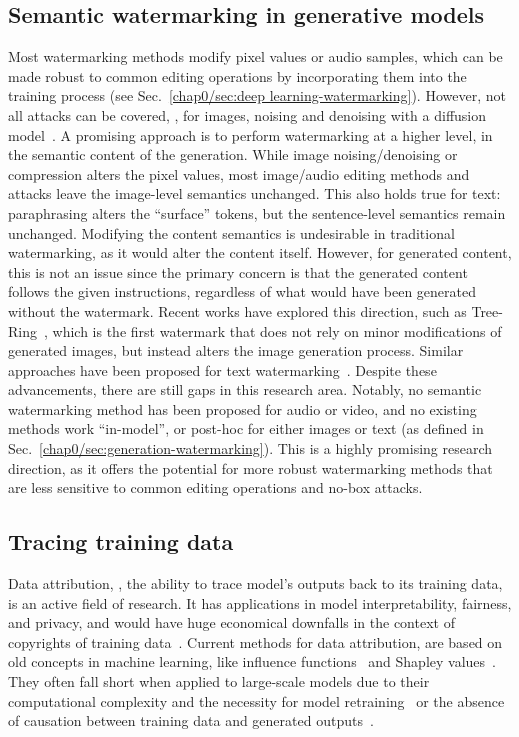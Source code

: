\subsection{Semantic watermarking in generative models}

Most watermarking methods modify pixel values or audio samples, which can be made robust to common editing operations by incorporating them into the training process (see Sec.~\ref{chap0/sec:deep learning-watermarking}).
However, not all attacks can be covered, \eg, for images, noising and denoising with a diffusion model~\citep{nie2022diffusion}.
A promising approach is to perform watermarking at a higher level, in the semantic content of the generation. 
While image noising/denoising or compression alters the pixel values, most image/audio editing methods and attacks leave the image-level semantics unchanged. 
This also holds true for text: paraphrasing alters the ``surface'' tokens, but the sentence-level semantics remain unchanged.
Modifying the content semantics is undesirable in traditional watermarking, as it would alter the content itself.
However, for generated content, this is not an issue since the primary concern is that the generated content follows the given instructions, regardless of what would have been generated without the watermark.
Recent works have explored this direction, such as Tree-Ring~\citep{wen2023tree}, which is the first watermark that does not rely on minor modifications of generated images, but instead alters the image generation process. 
Similar approaches have been proposed for text watermarking~\citep{liu2023semantic,hou2023semstamp}.
Despite these advancements, there are still gaps in this research area. 
Notably, no semantic watermarking method has been proposed for audio or video, and no existing methods work ``in-model'', or post-hoc for either images or text (as defined in Sec.~\ref{chap0/sec:generation-watermarking}).
This is a highly promising research direction, as it offers the potential for more robust watermarking methods that are less sensitive to common editing operations and no-box attacks.






\subsection{Tracing training data}
Data attribution, \ie, the ability to trace model's outputs back to its training data, is an active field of research. 
It has applications in model interpretability, fairness, and privacy, and would have huge economical downfalls in the context of copyrights of training data~\citep{deng2024economic}.
Current methods for data attribution, are based on old concepts in machine learning, like influence functions~\citep{cook1977detection} and Shapley values~\citep{shapley1953value}.
They often fall short when applied to large-scale models due to their computational complexity and the necessity for model retraining~\citep{koh2017understanding, feldman2020neural, pruthi2020estimating, park2023trak} or the absence of causation between training data and generated outputs~\citep{wang2023evaluating}.

